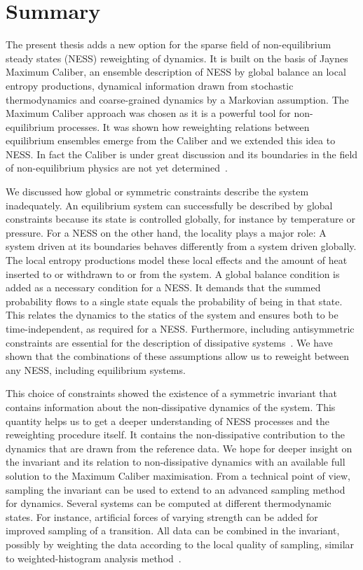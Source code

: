 \documentclass[12pt]{report}
\begin{document}
\chapter{Summary}
The present thesis adds a new option for the sparse field of non-equilibrium steady states (NESS) reweighting of dynamics. It is built on the basis of Jaynes Maximum Caliber, an ensemble description of NESS by global balance an local entropy productions, dynamical information drawn from stochastic thermodynamics and coarse-grained dynamics by a Markovian assumption. The Maximum Caliber approach was chosen as it is a powerful tool for non-equilibrium processes. It was shown how reweighting relations between equilibrium ensembles emerge from the Caliber and we extended this idea to NESS. In fact the Caliber is under great discussion and its boundaries in the field of non-equilibrium physics are not yet determined~\cite{ghosh2020maximum}. 

We discussed how global or symmetric constraints describe the system inadequately. An equilibrium system can successfully be described by global constraints because its state is controlled globally, for instance by temperature or pressure. For a NESS on the other hand, the locality plays a major role: A system driven at its boundaries behaves differently from a system driven globally. The local entropy productions model these local effects and the amount of heat inserted to or withdrawn to or from the system. A global balance condition is added as a necessary condition for a NESS. It demands that the summed probability flows to a single state equals the probability of being in that state. This relates the dynamics to the statics of the system and ensures both to be time-independent, as required for a NESS. Furthermore, including  antisymmetric constraints are essential for the description of dissipative systems~\cite{agozzino2019minimal}.  We have shown that the combinations of these assumptions allow us to reweight between any NESS, including equilibrium systems.

This choice of constraints showed the existence of a symmetric invariant that contains information about the non-dissipative dynamics of the system. This quantity helps us to get a deeper understanding of NESS processes and the reweighting procedure itself. It contains the non-dissipative contribution to the dynamics that are drawn from the reference data.  We hope for deeper insight on the invariant and its relation to non-dissipative dynamics with an available full solution to the Maximum Caliber maximisation. From a technical point of view, sampling the invariant can be used to extend to an advanced sampling method for dynamics. Several systems can be computed at different thermodynamic states. For instance, artificial forces of varying strength can be added for improved sampling of a transition. All data can be combined in the invariant, possibly by weighting the data according to the local quality  of sampling, similar to weighted-histogram analysis method~\cite{kumar1995multidimensional}. 
\end{document}
